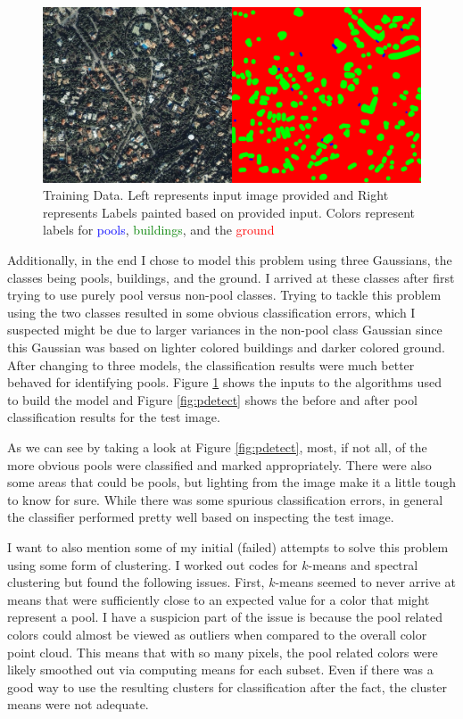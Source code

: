 \documentclass{article}[12pt]
\begin{document}
   \begin{figure}[ht]
   	\centerline{
   		\includegraphics[scale=0.3]{img/p4_train_data_compare.png}}
   	\caption{Training Data. Left represents input image provided and Right represents Labels painted based on provided input. Colors represent labels for \textcolor{blue}{pools}, \textcolor{green}{buildings}, and the \textcolor{red}{ground}}
   	\label{fig:ptrain}
   \end{figure}

   Additionally, in the end I chose to model this problem using three Gaussians, the classes being pools, buildings, and the ground. I arrived at these classes after first trying to use purely pool versus non-pool classes. Trying to tackle this problem using the two classes resulted in some obvious classification errors, which I suspected might be due to larger variances in the non-pool class Gaussian since this Gaussian was based on lighter colored buildings and darker colored ground. After changing to three models, the classification results were much better behaved for identifying pools. Figure \ref{fig:ptrain} shows the inputs to the algorithms used to build the model and Figure \ref{fig:pdetect} shows the before and after pool classification results for the test image. 
   
   As we can see by taking a look at Figure \ref{fig:pdetect}, most, if not all, of the more obvious pools were classified and marked appropriately. There were also some areas that could be pools, but lighting from the image make it a little tough to know for sure. While there was some spurious classification errors, in general the classifier performed pretty well based on inspecting the test image.
   
   I want to also mention some of my initial (failed) attempts to solve this problem using some form of clustering. I worked out codes for $k$-means and spectral clustering but found the following issues. First, $k$-means seemed to never arrive at means that were sufficiently close to an expected value for a color that might represent a pool. I have a suspicion part of the issue is because the pool related colors could almost be viewed as outliers when compared to the overall color point cloud. This means that with so many pixels, the pool related colors were likely smoothed out via computing means for each subset. Even if there was a good way to use the resulting clusters for classification after the fact, the cluster means were not adequate.
   
\end{document}

